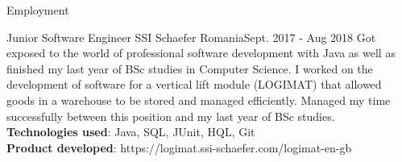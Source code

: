 \documentclass[]{mcdowellcv}
\begin{document}
\begin{cvsection}{Employment}
		\begin{cvsubsection}{Junior Software Engineer }{SSI Schaefer Romania}{Sept. 2017 - Aug 2018}
			\hspace{\parindent} \hspace{\parindent} \hspace{\parindent} \hspace{\parindent}  Got exposed to the world of professional software development with Java as well as finished my last year of BSc studies in Computer Science. I worked on the development of software for a vertical lift module (LOGIMAT) that allowed goods in a warehouse to be stored and managed efficiently. Managed my time successfully between this position and my last year of BSc studies.
      		\\ \textbf{Technologies used}: Java, SQL, JUnit, HQL, Git
		    \\ \textbf{Product developed}: https://logimat.ssi-schaefer.com/logimat-en-gb
		\end{cvsubsection}
		
  \end{cvsection}
\end{document}
